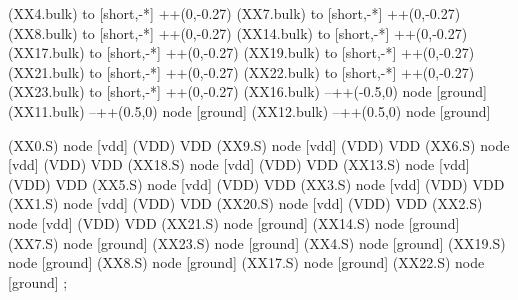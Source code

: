 \begin{circuitikz}[american]
	(XX4.bulk) to [short,-*] ++(0,-0.27)
	(XX7.bulk) to [short,-*] ++(0,-0.27)
	(XX8.bulk) to [short,-*] ++(0,-0.27)
	(XX14.bulk) to [short,-*] ++(0,-0.27)
	(XX17.bulk) to [short,-*] ++(0,-0.27)
	(XX19.bulk) to [short,-*] ++(0,-0.27)
	(XX21.bulk) to [short,-*] ++(0,-0.27)
	(XX22.bulk) to [short,-*] ++(0,-0.27)
	(XX23.bulk) to [short,-*] ++(0,-0.27)
	(XX16.bulk) --++(-0.5,0) node [ground] {}
	(XX11.bulk) --++(0.5,0) node [ground] {}
	(XX12.bulk) --++(0.5,0) node [ground] {}
	

	(XX0.S) node [vdd] (VDD) {VDD}
	(XX9.S) node [vdd] (VDD) {VDD}
	(XX6.S) node [vdd] (VDD) {VDD}
	(XX18.S) node [vdd] (VDD) {VDD}
	(XX13.S) node [vdd] (VDD) {VDD}
	(XX5.S) node [vdd] (VDD) {VDD}
	(XX3.S) node [vdd] (VDD) {VDD}
	(XX1.S) node [vdd] (VDD) {VDD}
	(XX20.S) node [vdd] (VDD) {VDD}
	(XX2.S) node [vdd] (VDD) {VDD}
	(XX21.S) node [ground] {}
	(XX14.S) node [ground] {}
	(XX7.S) node [ground] {}
	(XX23.S) node [ground] {}
	(XX4.S) node [ground] {}
	(XX19.S) node [ground] {}
	(XX8.S) node [ground] {}
	(XX17.S) node [ground] {}
	(XX22.S) node [ground] {}
;

\end{circuitikz}
